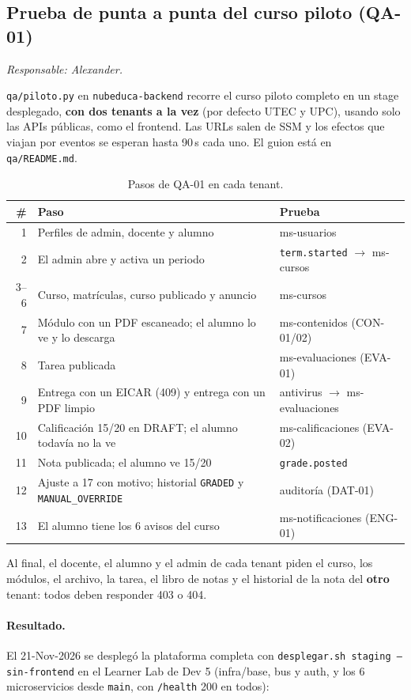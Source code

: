 \subsection{Prueba de punta a punta del curso piloto (QA-01)}
\textit{Responsable: Alexander.}

\texttt{qa/piloto.py} en \texttt{nubeduca-backend} recorre el curso piloto completo en un stage
desplegado, \textbf{con dos tenants a la vez} (por defecto UTEC y UPC), usando solo las APIs públicas, como
el frontend. Las URLs salen de SSM y los efectos que viajan por eventos se esperan hasta 90\,s cada uno.
El guion está en \texttt{qa/README.md}.

\begin{table}[htbp]
\centering\small
\begin{tabularx}{\textwidth}{rXl}
\toprule
\# & Paso & Prueba \\
\midrule
1 & Perfiles de admin, docente y alumno & ms-usuarios \\
2 & El admin abre y activa un periodo & \texttt{term.started} $\rightarrow$ ms-cursos \\
3--6 & Curso, matrículas, curso publicado y anuncio & ms-cursos \\
7 & Módulo con un PDF escaneado; el alumno lo ve y lo descarga & ms-contenidos (CON-01/02) \\
8 & Tarea publicada & ms-evaluaciones (EVA-01) \\
9 & Entrega con un EICAR (409) y entrega con un PDF limpio & antivirus $\rightarrow$ ms-evaluaciones \\
10 & Calificación 15/20 en DRAFT; el alumno todavía no la ve & ms-calificaciones (EVA-02) \\
11 & Nota publicada; el alumno ve 15/20 & \texttt{grade.posted} \\
12 & Ajuste a 17 con motivo; historial \texttt{GRADED} y \texttt{MANUAL\_OVERRIDE} & auditoría (DAT-01) \\
13 & El alumno tiene los 6 avisos del curso & ms-notificaciones (ENG-01) \\
\bottomrule
\end{tabularx}
\caption{Pasos de QA-01 en cada tenant.}
\end{table}

Al final, el docente, el alumno y el admin de cada tenant piden el curso, los módulos, el archivo, la
tarea, el libro de notas y el historial de la nota del \textbf{otro} tenant: todos deben responder 403 o
404.

\paragraph{Resultado.} El 21-Nov-2026 se desplegó la plataforma completa con
\texttt{desplegar.sh staging --sin-frontend} en el Learner Lab de Dev 5 (infra/base, bus y auth, y los 6
microservicios desde \texttt{main}, con \texttt{/health} 200 en todos):

